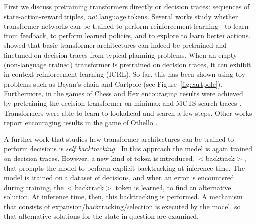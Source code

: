First we discuss pretraining transformers directly on decision traces: sequences of state-action-reward triples, {\em not} language tokens. %
Several works study whether transformer networks can be trained to perform reinforcement learning---to learn from feedback, to perform learned policies, and to explore to learn better actions. \citet{chen2021decision,lee2023supervised,wang2024transformers}  showed that  basic transformer architectures can indeed be pretrained and finetuned on decision  traces from typical planning problems. %
When an empty (non-language trained) transformer is pretrained on decision traces, it can exhibit in-context reinforcement learning (ICRL). So far, this has been shown using toy problems such as Boyan's chain and Cartpole (see Figure~\ref{fig:cartpole}).  
Furthermore, in the games of Chess and Hex encouraging results were achieved by pretraining the decision transformer on minimax \citep{markeeva2024clrs,knuth1975analysis} and MCTS \citep{browne2012survey} search traces \citep{schultz2024mastering,kempinski2025game}. Transformers were able to learn to lookahead and search a few steps. Other works report encouraging results in the game of Othello \citep{li2023emergent,kempinski2025game,chen2025if}. 

A further work that studies how transformer architectures can be trained to perform decisions is {\em self backtracking} \citep{yang2026step}. In this approach the model is again trained on decision traces. However,  a new kind of token is introduced, $<$backtrack$>$, that prompts the model to perform explicit backtracking at inference time. The model is trained on a dataset of decisions, and when an error is encountered during training, the $<$backtrack$>$ token is learned, to find an alternative solution. At inference time, then, this backtracking is performed. A mechanism that consists of expansion/backtracking/selection is executed by the model, so that alternative solutions for the state in question are examined. 

